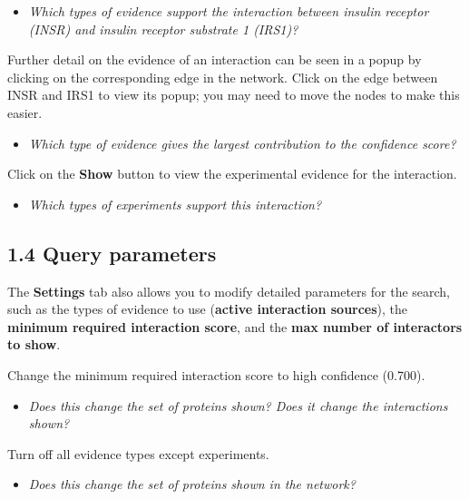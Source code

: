 \documentclass[a4paper]{article}
\begin{document}
\begin{itemize}
  \item \textit{Which types of evidence support the interaction between insulin receptor (INSR) and insulin receptor substrate 1 (IRS1)?}
\end{itemize}

Further detail on the evidence of an interaction can be seen in a popup by clicking on the corresponding edge in the network. Click on the edge between INSR and IRS1 to view its popup; you may need to move the nodes to make this easier.

\begin{itemize}
  \item \textit{Which type of evidence gives the largest contribution to the confidence score?}
\end{itemize}

Click on the \textbf{Show} button to view the experimental evidence for the interaction.

\begin{itemize}
  \item \textit{Which types of experiments support this interaction?}
\end{itemize}

\vspace{0,5cm}

\subsection*{1.4 Query parameters}
The \textbf{Settings} tab also allows you to modify detailed parameters for the search, such as the types of evidence to use (\textbf{active interaction sources}), the \textbf{minimum required interaction score}, and the \textbf{max number of interactors to show}.

\vspace{0,2cm}

Change the minimum required interaction score to high confidence (0.700).

\begin{itemize}
  \item \textit{Does this change the set of proteins shown? Does it change the interactions shown?}
\end{itemize}

Turn off all evidence types except experiments.

\begin{itemize}
  \item \textit{Does this change the set of proteins shown in the network?}
\end{itemize}
\end{document}
